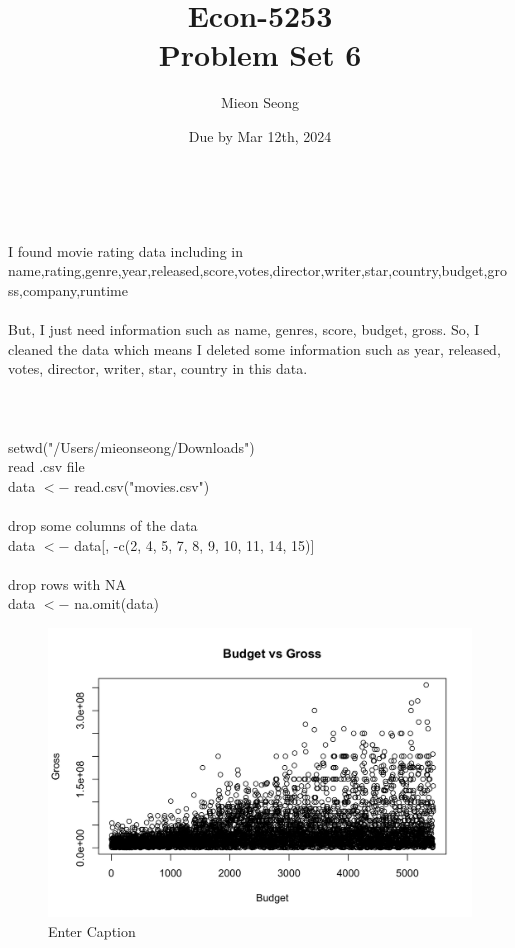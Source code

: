 \documentclass[12pt, letterpaper]{article}
\title{Econ-5253\\
{Problem Set 6}  \\
\large  \vspace{-1em}}
\author{Mieon Seong}
\date{Due by Mar 12th, 2024}
\begin{document}
\setlength{\abovedisplayskip}{5pt}
\setlength{\belowdisplayskip}{5pt}
\setlength{\abovedisplayshortskip}{5pt}
\setlength{\belowdisplayshortskip}{5pt}

\maketitle

\noindent {}\\
\\
\indent I found movie rating data including in 
name,rating,genre,year,released,score,votes,director,writer,star,country,budget,gross,company,runtime
\\
\\
But, I just need information such as name, genres, score, budget, gross. So, I cleaned the data which means I deleted some information such as year, released, votes, director, writer, star, country in this data. 
\\
\\
\noindent {}\\
\\
\indent setwd("/Users/mieonseong/Downloads")
\\
 read .csv file\\
data $<-$ read.csv("movies.csv")\\
\\
 drop some columns of the data\\
data $<-$ data[, -c(2, 4, 5, 7, 8, 9, 10, 11, 14, 15)]\\
\\
drop rows with NA\\
data $<-$ na.omit(data)
\\
\newpage
\begin{figure}
    \centering
    \includegraphics[width=1\linewidth]{PS6a_Seong.png}
    \caption{Enter Caption}
    \label{fig:enter-label}
\end{figure}
\end{document}
